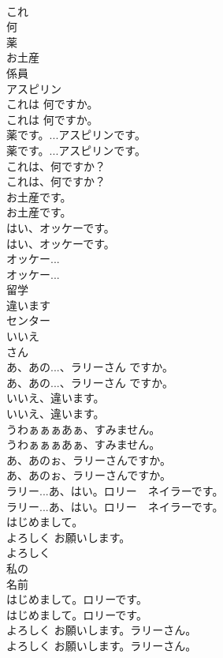 \documentclass[8pt]{extreport}
\begin{document}
\begin{CJK}{UTF8}{min}
\\	これ
\\	何
\\	薬
\\	お土産
\\	係員
\\	アスピリン
\\	これは 何ですか。	
\\	これは 何ですか。 
\\	薬です。...アスピリンです。	
\\	薬です。...アスピリンです。 
\\	これは、何ですか？	
\\	これは、何ですか？ 
\\	お土産です。	
\\	お土産です。 
\\	はい、オッケーです。	
\\	はい、オッケーです。 
\\	オッケー...	
\\	オッケー... 
\\	留学
\\	違います
\\	センター
\\	いいえ
\\	さん
\\	あ、あの...、ラリーさん ですか。	
\\	あ、あの...、ラリーさん ですか。 
\\	いいえ、違います。	
\\	いいえ、違います。 
\\	うわぁぁぁあぁ、すみません。	
\\	うわぁぁぁあぁ、すみません。 
\\	あ、あのぉ、ラリーさんですか。	
\\	あ、あのぉ、ラリーさんですか。 
\\	ラリー...あ、はい。ロリー　ネイラーです。	
\\	ラリー...あ、はい。ロリー　ネイラーです。 
\\	はじめまして。
\\	よろしく お願いします。
\\	よろしく
\\	私の
\\	名前
\\	はじめまして。ロリーです。	
\\	はじめまして。ロリーです。 
\\	よろしく お願いします。ラリーさん。	
\\	よろしく お願いします。ラリーさん。 

\end{CJK}
\end{document}
